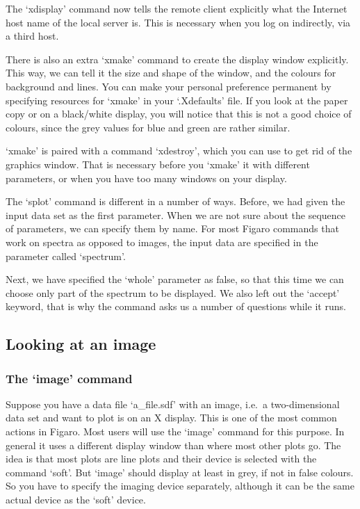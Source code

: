 \documentclass[11pt,twoside]{article}
\newcommand{\xlabel}[1]{}
\begin{document}
   The `xdisplay' command now tells the remote client explicitly what
   the Internet host name of the local server is. This is necessary when
   you log on indirectly, via a third host.

   There is also an extra `xmake' command to create the display window
   explicitly. This way, we can tell it the size and shape of the
   window, and the colours for background and lines. You can make your
   personal preference permanent by specifying resources for `xmake'
   in your `.Xdefaults' file. If you look at the paper copy or on a
   black/white display, you will notice that this is not a good choice
   of colours, since the grey values for blue and green are rather
   similar.

   `xmake' is paired with a command `xdestroy', which you can use to
   get rid of the graphics window. That is necessary before you
   `xmake' it with different parameters, or when you have too many
   windows on your display.

   The `splot' command is different in a number of ways. Before, we had
   given the input data set as the first parameter. When we are not sure
   about the sequence of parameters, we can specify them by name. For
   most Figaro commands that work on spectra as opposed to images, the
   input data are specified in the parameter called `spectrum'.

   Next, we have specified the `whole' parameter as false, so that
   this time we can choose only part of the spectrum to be displayed. We
   also left out the `accept' keyword, that is why the command asks us
   a number of questions while it runs.


\subsection{\xlabel{lookimag}\label{lookimag}Looking at an image}


\subsubsection{\label{lookimagimage}The `image' command}

   Suppose you have a data file `a\_file.sdf' with an image, i.e.\ a
   two-dimensional data set and want to plot is on an X display. This is
   one of the most common actions in Figaro. Most users will use the
   `image' command for this purpose. In general it uses a different
   display window than where most other plots go. The idea is that most
   plots are line plots and their device is selected with the command
   `soft'. But `image' should display at least in grey, if not in
   false colours. So you have to specify the imaging device separately,
   although it can be the same actual device as the `soft' device.
\end{document}
